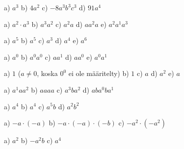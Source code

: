 \begin{tehtavasivu}
\begin{tehtava}
        \begin{vastaus}
            a) $a^3$ \qquad
            b) $4a^2$ \qquad
            c) $-8a^3b^3c^3$ \qquad
            d) $91a^4$
        \end{vastaus}
    \end{tehtava}
       
    \begin{tehtava}
        a) $a^2\cdot a^3$ \qquad
        b) $a^3a^2$ \qquad
        c) $a^2 a$ \qquad
        d) $a a^2 a$ \qquad
        e) $a^2a^1a^3$
        
        \begin{vastaus}
            a) $a^5$ \qquad
            b) $a^5$ \qquad
            c) $a^3$ \qquad
            d) $a^4$ \qquad
            e) $a^6$
        \end{vastaus}
    \end{tehtava}
    
    \begin{tehtava}
        a) $a^0$ \qquad
        b) $a^0a^0$ \qquad
        c) $a a^1$ \qquad
        d) $aa^0$ \qquad
        e) $a^0a^1$
        
        \begin{vastaus}
            a) $1$ \quad ($a\neq0$, koska $0^0$ ei ole määritelty) \qquad
            b) $1$ \qquad
            c) $a$ \qquad
            d) $a^2$ \qquad
            e) $a$
        \end{vastaus}
    \end{tehtava}
    
    \begin{tehtava}
        a) $a^1 a a^2$ \qquad
        b) $aaaa$ \qquad
        c) $a^3ba^2$ \qquad
        d) $aba^0ba^1$
        
        \begin{vastaus}
            a) $ a^4$ \qquad
            b) $a^4$ \qquad
            c) $a^5b$ \qquad
            d) $a^2b^2$
        \end{vastaus}
    \end{tehtava}
       

    \begin{tehtava}
        a) $-a\cdot(-a)$ \qquad
        b) $-a\cdot(-a)\cdot(-b)$ \qquad
        c) $-a^2\cdot(-a^2)$
    
        \begin{vastaus}
            a) $a^2$ \qquad
            b) $-a^2b$ \qquad
            c) $a^4$
        \end{vastaus}
    \end{tehtava}


\end{tehtavasivu}
